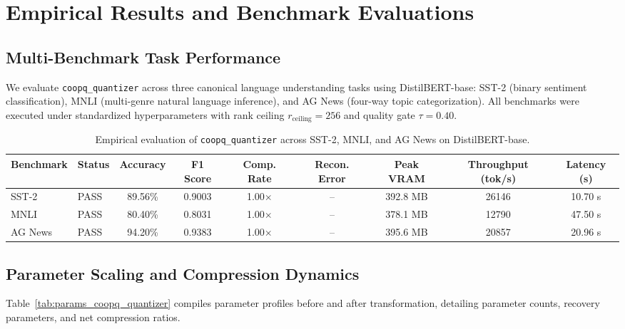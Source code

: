 \section{Empirical Results and Benchmark Evaluations}
\label{sec:results}

\subsection{Multi-Benchmark Task Performance}
We evaluate \texttt{coopq\_quantizer} across three canonical language understanding tasks using DistilBERT-base: SST-2 (binary sentiment classification), MNLI (multi-genre natural language inference), and AG News (four-way topic categorization). All benchmarks were executed under standardized hyperparameters with rank ceiling $r_{\mathrm{ceiling}} = 256$ and quality gate $\tau = 0.40$.

\begin{table}[t]
\centering
\small
\begin{tabular}{llccccccc}
\toprule
\textbf{Benchmark} & \textbf{Status} & \textbf{Accuracy} & \textbf{F1 Score} & \textbf{Comp. Rate} & \textbf{Recon. Error} & \textbf{Peak VRAM} & \textbf{Throughput (tok/s)} & \textbf{Latency (s)} \\
\midrule
SST-2 & PASS & 89.56\% & 0.9003 & 1.00$\times$ & -- & 392.8 MB & 26146 & 10.70 s \\
MNLI & PASS & 80.40\% & 0.8031 & 1.00$\times$ & -- & 378.1 MB & 12790 & 47.50 s \\
AG News & PASS & 94.20\% & 0.9383 & 1.00$\times$ & -- & 395.6 MB & 20857 & 20.96 s \\
\bottomrule
\end{tabular}
\caption{Empirical evaluation of \texttt{coopq\_quantizer} across SST-2, MNLI, and AG News on DistilBERT-base.}
\label{tab:results_coopq_quantizer}
\end{table}

\subsection{Parameter Scaling and Compression Dynamics}
Table~\ref{tab:params_coopq_quantizer} compiles parameter profiles before and after transformation, detailing parameter counts, recovery parameters, and net compression ratios.

